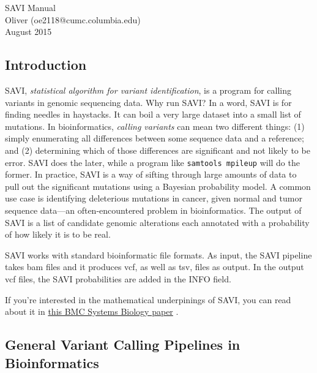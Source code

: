 \documentclass[letterpaper,14pt]{memoir}
\begin{document}

\begin{center}
\huge{SAVI Manual}\\[0.1in]
\small{Oliver (oe2118@cumc.columbia.edu)\\August 2015}
\end{center}
   
\subsection{Introduction}

SAVI, \emph{statistical algorithm for variant identification}, is a program for calling variants in genomic sequencing data. Why run SAVI? In a word, SAVI is for finding needles in haystacks. It can boil a very large dataset into a small list of mutations. In bioinformatics, \emph{calling variants} can mean two different things: (1) simply enumerating all differences between some sequence data and a reference; and (2) determining which of those differences are significant and not likely to be error. SAVI does the later, while a program like \texttt{samtools mpileup} will do the former. In practice, SAVI is a way of sifting through large amounts of data to pull out the significant mutations using a Bayesian probability model. A common use case is identifying deleterious mutations in cancer, given normal and tumor sequence data---an often-encountered problem in bioinformatics. The output of SAVI is a list of candidate genomic alterations each annotated with a probability of how likely it is to be real.

SAVI works with standard bioinformatic file formats. As input, the SAVI pipeline takes bam files and it produces vcf, as well as tsv, files as output. In the output vcf files, the SAVI probabilities are added in the INFO field.

If you're interested in the mathematical underpinings of SAVI, you can read about it in \href{https://www.biomedcentral.com/1752-0509/7/S2/S2}{this BMC Systems Biology paper} \cite{saviref}.

\subsection{General Variant Calling Pipelines in Bioinformatics}\label{General Variant Calling}
\end{document}
